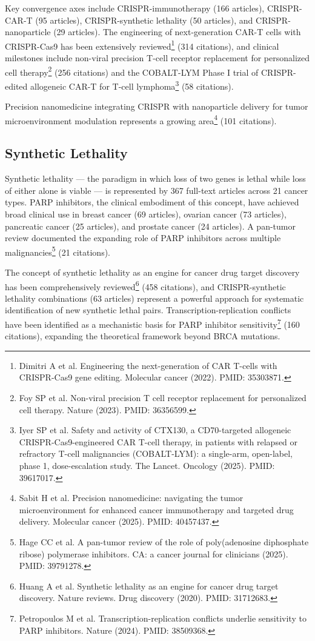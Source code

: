 \documentclass[11pt,twoside,openright]{report}
\begin{document}
Key convergence axes include CRISPR-immunotherapy (166 articles), CRISPR-CAR-T (95 articles), CRISPR-synthetic lethality (50 articles), and CRISPR-nanoparticle (29 articles). The engineering of next-generation CAR-T cells with CRISPR-Cas9 has been extensively reviewed\footnote{Dimitri A et al. Engineering the next-generation of CAR T-cells with CRISPR-Cas9 gene editing. Molecular cancer (2022). PMID: 35303871.} (314 citations), and clinical milestones include non-viral precision T-cell receptor replacement for personalized cell therapy\footnote{Foy SP et al. Non-viral precision T cell receptor replacement for personalized cell therapy. Nature (2023). PMID: 36356599.} (256 citations) and the COBALT-LYM Phase I trial of CRISPR-edited allogeneic CAR-T for T-cell lymphoma\footnote{Iyer SP et al. Safety and activity of CTX130, a CD70-targeted allogeneic CRISPR-Cas9-engineered CAR T-cell therapy, in patients with relapsed or refractory T-cell malignancies (COBALT-LYM): a single-arm, open-label, phase 1, dose-escalation study. The Lancet. Oncology (2025). PMID: 39617017.} (58 citations).

Precision nanomedicine integrating CRISPR with nanoparticle delivery for tumor microenvironment modulation represents a growing area\footnote{Sabit H et al. Precision nanomedicine: navigating the tumor microenvironment for enhanced cancer immunotherapy and targeted drug delivery. Molecular cancer (2025). PMID: 40457437.} (101 citations).

\subsection{Synthetic Lethality}

Synthetic lethality --- the paradigm in which loss of two genes is lethal while loss of either alone is viable --- is represented by 367 full-text articles across 21 cancer types. PARP inhibitors, the clinical embodiment of this concept, have achieved broad clinical use in breast cancer (69 articles), ovarian cancer (73 articles), pancreatic cancer (25 articles), and prostate cancer (24 articles). A pan-tumor review documented the expanding role of PARP inhibitors across multiple malignancies\footnote{Hage CC et al. A pan-tumor review of the role of poly(adenosine diphosphate ribose) polymerase inhibitors. CA: a cancer journal for clinicians (2025). PMID: 39791278.} (21 citations).

The concept of synthetic lethality as an engine for cancer drug target discovery has been comprehensively reviewed\footnote{Huang A et al. Synthetic lethality as an engine for cancer drug target discovery. Nature reviews. Drug discovery (2020). PMID: 31712683.} (458 citations), and CRISPR-synthetic lethality combinations (63 articles) represent a powerful approach for systematic identification of new synthetic lethal pairs. Transcription-replication conflicts have been identified as a mechanistic basis for PARP inhibitor sensitivity\footnote{Petropoulos M et al. Transcription-replication conflicts underlie sensitivity to PARP inhibitors. Nature (2024). PMID: 38509368.} (160 citations), expanding the theoretical framework beyond BRCA mutations.
\end{document}
